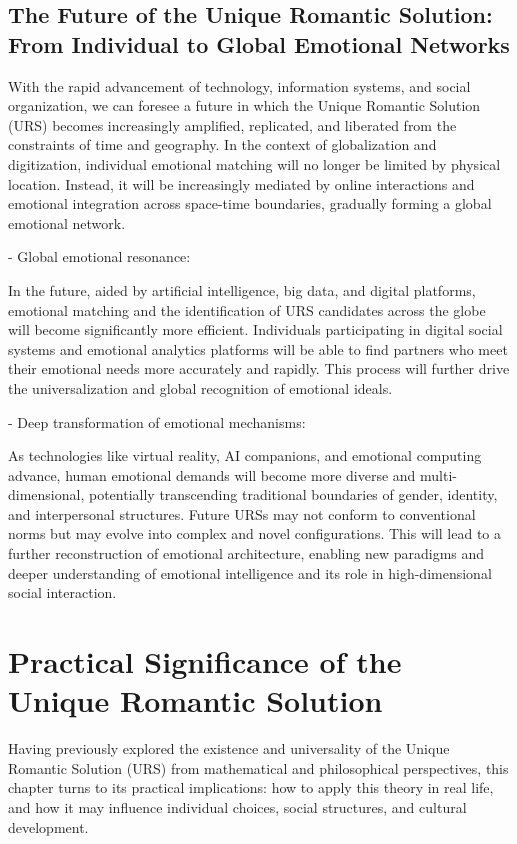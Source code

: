 \documentclass{article}
\begin{document}
\subsection{The Future of the Unique Romantic Solution: From Individual to Global Emotional Networks}

With the rapid advancement of technology, information systems, and social organization, we can foresee a future in which the Unique Romantic Solution (URS) becomes increasingly amplified, replicated, and liberated from the constraints of time and geography. In the context of globalization and digitization, individual emotional matching will no longer be limited by physical location. Instead, it will be increasingly mediated by online interactions and emotional integration across space-time boundaries, gradually forming a global emotional network.

- Global emotional resonance: 

In the future, aided by artificial intelligence, big data, and digital platforms, emotional matching and the identification of URS candidates across the globe will become significantly more efficient. Individuals participating in digital social systems and emotional analytics platforms will be able to find partners who meet their emotional needs more accurately and rapidly. This process will further drive the universalization and global recognition of emotional ideals.

- Deep transformation of emotional mechanisms: 

As technologies like virtual reality, AI companions, and emotional computing advance, human emotional demands will become more diverse and multi-dimensional, potentially transcending traditional boundaries of gender, identity, and interpersonal structures. Future URSs may not conform to conventional norms but may evolve into complex and novel configurations. This will lead to a further reconstruction of emotional architecture, enabling new paradigms and deeper understanding of emotional intelligence and its role in high-dimensional social interaction.

\section{Practical Significance of the Unique Romantic Solution}

Having previously explored the existence and universality of the Unique Romantic Solution (URS) from mathematical and philosophical perspectives, this chapter turns to its practical implications: how to apply this theory in real life, and how it may influence individual choices, social structures, and cultural development.
\end{document}

